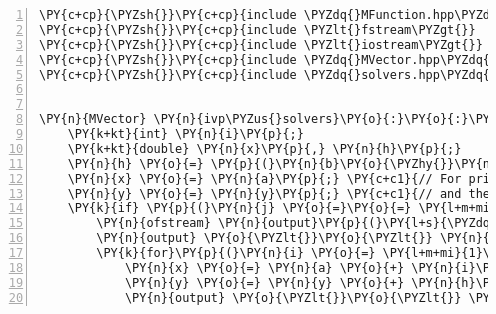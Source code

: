 \begin{Verbatim}[tabsize=2,commandchars=\\\{\},numbers=left,firstnumber=1,stepnumber=1]
\PY{c+cp}{\PYZsh{}}\PY{c+cp}{include \PYZdq{}MFunction.hpp\PYZdq{}}
\PY{c+cp}{\PYZsh{}}\PY{c+cp}{include \PYZlt{}fstream\PYZgt{}}
\PY{c+cp}{\PYZsh{}}\PY{c+cp}{include \PYZlt{}iostream\PYZgt{}}
\PY{c+cp}{\PYZsh{}}\PY{c+cp}{include \PYZdq{}MVector.hpp\PYZdq{}}
\PY{c+cp}{\PYZsh{}}\PY{c+cp}{include \PYZdq{}solvers.hpp\PYZdq{}}


\PY{n}{MVector} \PY{n}{ivp\PYZus{}solvers}\PY{o}{:}\PY{o}{:}\PY{n}{euler}\PY{p}{(}\PY{n}{MVector} \PY{o}{\PYZam{}}\PY{n}{y}\PY{p}{,} \PY{n}{MFunction} \PY{o}{\PYZam{}}\PY{n}{f}\PY{p}{,} \PY{k+kt}{int} \PY{n}{j}\PY{p}{)}\PY{p}{\PYZob{}}
	\PY{k+kt}{int} \PY{n}{i}\PY{p}{;}
	\PY{k+kt}{double} \PY{n}{x}\PY{p}{,} \PY{n}{h}\PY{p}{;}
	\PY{n}{h} \PY{o}{=} \PY{p}{(}\PY{n}{b}\PY{o}{\PYZhy{}}\PY{n}{a}\PY{p}{)}\PY{o}{/}\PY{n}{steps}\PY{p}{;}
	\PY{n}{x} \PY{o}{=} \PY{n}{a}\PY{p}{;} \PY{c+c1}{// For printing, these are set to their initial values}
	\PY{n}{y} \PY{o}{=} \PY{n}{y}\PY{p}{;} \PY{c+c1}{// and the loop started from 1 instead of 0 to get the file right}
	\PY{k}{if} \PY{p}{(}\PY{n}{j} \PY{o}{=}\PY{o}{=} \PY{l+m+mi}{1}\PY{p}{)}\PY{p}{\PYZob{}} \PY{c+c1}{// when printing}
		\PY{n}{ofstream} \PY{n}{output}\PY{p}{(}\PY{l+s}{\PYZdq{}}\PY{l+s}{output\PYZus{}euler.csv}\PY{l+s}{\PYZdq{}}\PY{p}{)}\PY{p}{;}
		\PY{n}{output} \PY{o}{\PYZlt{}}\PY{o}{\PYZlt{}} \PY{n}{x} \PY{o}{\PYZlt{}}\PY{o}{\PYZlt{}} \PY{l+s}{\PYZdq{}}\PY{l+s}{,}\PY{l+s}{\PYZdq{}} \PY{o}{\PYZlt{}}\PY{o}{\PYZlt{}} \PY{n}{y}\PY{p}{[}\PY{l+m+mi}{0}\PY{p}{]} \PY{o}{\PYZlt{}}\PY{o}{\PYZlt{}} \PY{l+s}{\PYZdq{}}\PY{l+s}{,}\PY{l+s}{\PYZdq{}} \PY{o}{\PYZlt{}}\PY{o}{\PYZlt{}} \PY{n}{y}\PY{p}{[}\PY{l+m+mi}{1}\PY{p}{]} \PY{o}{\PYZlt{}}\PY{o}{\PYZlt{}} \PY{n}{endl}\PY{p}{;}
		\PY{k}{for}\PY{p}{(}\PY{n}{i} \PY{o}{=} \PY{l+m+mi}{1}\PY{p}{;} \PY{n}{i} \PY{o}{\PYZlt{}} \PY{n}{steps}\PY{o}{+}\PY{l+m+mi}{1}\PY{p}{;} \PY{n}{i}\PY{o}{+}\PY{o}{+}\PY{p}{)}\PY{p}{\PYZob{}}
			\PY{n}{x} \PY{o}{=} \PY{n}{a} \PY{o}{+} \PY{n}{i}\PY{o}{*}\PY{n}{h}\PY{p}{;}
			\PY{n}{y} \PY{o}{=} \PY{n}{y} \PY{o}{+} \PY{n}{h}\PY{o}{*}\PY{n}{f}\PY{p}{(}\PY{n}{x}\PY{p}{,} \PY{n}{y}\PY{p}{)}\PY{p}{;}
			\PY{n}{output} \PY{o}{\PYZlt{}}\PY{o}{\PYZlt{}} \PY{n}{x} \PY{o}{\PYZlt{}}\PY{o}{\PYZlt{}} \PY{l+s}{\PYZdq{}}\PY{l+s}{,}\PY{l+s}{\PYZdq{}} \PY{o}{\PYZlt{}}\PY{o}{\PYZlt{}} \PY{n}{y}\PY{p}{[}\PY{l+m+mi}{0}\PY{p}{]} \PY{o}{\PYZlt{}}\PY{o}{\PYZlt{}} \PY{l+s}{\PYZdq{}}\PY{l+s}{,}\PY{l+s}{\PYZdq{}} \PY{o}{\PYZlt{}}\PY{o}{\PYZlt{}} \PY{n}{y}\PY{p}{[}\PY{l+m+mi}{1}\PY{p}{]} \PY{o}{\PYZlt{}}\PY{o}{\PYZlt{}} \PY{n}{endl}\PY{p}{;}

\end{Verbatim}
